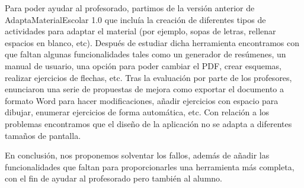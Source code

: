 Para poder ayudar al profesorado, partimos de la versión anterior de AdaptaMaterialEscolar 1.0 que incluía la creación de diferentes tipos de actividades para adaptar el material (por ejemplo, sopas de letras, rellenar espacios en blanco, etc). Después de estudiar dicha herramienta encontramos con que faltan algunas funcionalidades tales como un generador de resúmenes, un manual de usuario, una opción para poder cambiar el PDF, crear esquemas, realizar ejercicios de flechas, etc. Tras la evaluación por parte de los profesores, enunciaron una serie de propuestas de mejora como exportar el documento a formato Word para hacer modificaciones, añadir ejercicios con espacio para dibujar, enumerar ejercicios de forma automática, etc. Con relación a los problemas encontramos que el diseño de la aplicación no se adapta a diferentes tamaños de pantalla. 

En conclusión, nos proponemos solventar los fallos, además de añadir las funcionalidades que faltan para proporcionarles una herramienta más completa, con el fin de ayudar al profesorado pero también al alumno. 

